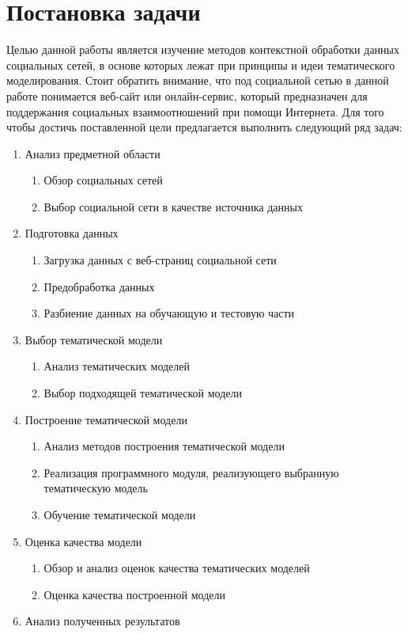 \documentclass[a4paper]{report}
\begin{document}
	\section{Постановка задачи}
	Целью данной работы является изучение методов контекстной обработки данных социальных сетей, в основе которых лежат при принципы и идеи тематического моделирования. Стоит обратить внимание, что под социальной сетью в данной работе понимается веб-сайт или онлайн-сервис, который предназначен для поддержания социальных взаимоотношений при помощи Интернета. 
	 Для того чтобы достичь поставленной цели предлагается выполнить следующий ряд задач:
	
	
	\renewcommand{\labelenumi}{\arabic{enumi}.}
	\renewcommand{\labelenumii}{\arabic{enumi}.\arabic{enumii}}

	\begin{enumerate}
	\item{Анализ предметной области}
		\begin{enumerate}
		\item{Обзор социальных сетей}
		\item{Выбор социальной сети в качестве источника данных}
		\end{enumerate}
	\item{Подготовка данных}
		\begin{enumerate}
		\item{Загрузка данных с веб-страниц социальной сети}
		\item{Предобработка данных}
		\item{Разбиение данных на обучающую и тестовую части}
		\end{enumerate}
	\item{Выбор тематической модели}
		\begin{enumerate}
		\item{Анализ тематических моделей}
		\item{Выбор подходящей тематической модели}
		\end{enumerate}
	\item{Построение тематической модели}
		\begin{enumerate}
		\item{Анализ методов построения тематической модели}
		\item{Реализация программного модуля, реализующего выбранную тематическую модель}
		\item{Обучение тематической модели}
		\end{enumerate}
	\item{Оценка качества модели}
		\begin{enumerate}
		\item{Обзор и анализ оценок качества тематических моделей}
		\item{Оценка качества построенной модели}
		\end{enumerate}
	\item{Анализ полученных результатов}
	\end{enumerate}
\end{document}

